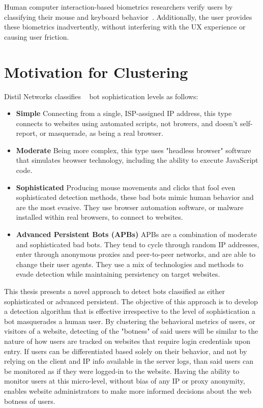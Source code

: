 Human computer interaction-based biometrics researchers verify users by classifying their mouse and keyboard behavior~\cite{human_computer_interaction_based_intrusion_detection}.
Additionally, the user provides these biometrics inadvertently, without interfering with the UX experience or causing user friction.

\section{Motivation for Clustering}\label{sec:motivation-for-clustering}
Distil Networks classifies ~\cite{bad_bot_report} bot sophistication levels as follows:
\begin{itemize}
    \item \textbf{Simple}
        Connecting from a single, ISP-assigned IP address, this type connects to websites using automated scripts, not browers, and doesn't self-report, or masquerade, as being a real browser.
    \item \textbf{Moderate}
        Being more complex, this type uses "headless browser" software that simulates browser technology, including the ability to execute JavaScript code.
    \item \textbf{Sophisticated}
        Producing mouse movements and clicks that fool even sophisticated detection methods, these bad bots mimic human behavior and are the most evasive. They use browser automation software, or malware installed within real browsers, to connect to websites.
    \item \textbf{Advanced Persistent Bots (APBs)}
        APBs are a combination of moderate and sophisticated bad bots. They tend to cycle through random IP addresses, enter through anonymous proxies and peer-to-peer networks, and are able to change their user agents. They use a mix of technologies and methods to evade detection while maintaining persistency on target websites.
\end{itemize}
This thesis presents a novel approach to detect bots classified as either sophisticated or advanced persistent.
The objective of this approach is to develop a detection algorithm that is effective irrespective to the level of sophistication a bot masquerades a human user.
By clustering the behavioral metrics of users, or visitors of a website, detecting of the "botness" of said users will be similar to the nature of how users are tracked on websites that require login credentials upon entry.
If users can be differentiated based solely on their behavior, and not by relying on the client and IP info available in the server logs, than said users can be monitored as if they were logged-in to the website.
Having the ability to monitor users at this micro-level, without bias of any IP or proxy anonymity, enables website administrators to make more informed decisions about the web botness of users.
﻿
